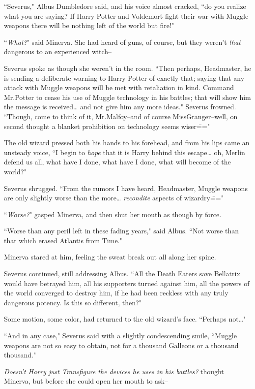 ``Severus," Albus Dumbledore said, and his voice almost cracked, ``do you realize what you are saying? If Harry Potter and Voldemort fight their war with Muggle weapons there will be nothing left of the world but fire!"

``\emph{What?}" said Minerva. She had heard of guns, of course, but they weren't \emph{that} dangerous to an experienced witch\---

Severus spoke as though she weren't in the room. ``Then perhaps, Headmaster, he is sending a deliberate warning to Harry Potter of exactly that; saying that any attack with Muggle weapons will be met with retaliation in kind. Command Mr.\?Potter to cease his use of Muggle technology in his battles; that will show him the message is received{\ldots} and not give him any more ideas." Severus frowned. ``Though, come to think of it, Mr.\?Malfoy\---and of course Miss\?Granger\---well, on second thought a blanket prohibition on technology seems wiser\==="

The old wizard pressed both his hands to his forehead, and from his lips came an unsteady voice, ``I begin to \emph{hope} that it is Harry behind this escape{\ldots} oh, Merlin defend us all, what have I done, what have I done, what will become of the world?"

Severus shrugged. ``From the rumors I have heard, Headmaster, Muggle weapons are only slightly worse than the more{\ldots} \emph{recondite} aspects of wizardry\==="

``\emph{Worse?}" gasped Minerva, and then shut her mouth as though by force.

``Worse than any peril left in these fading years," said Albus. ``Not worse than that which erased Atlantis from Time."

Minerva stared at him, feeling the sweat break out all along her spine.

Severus continued, still addressing Albus. ``All the Death Eaters save Bellatrix would have betrayed him, all his supporters turned against him, all the powers of the world converged to destroy him, if he had been reckless with any truly dangerous potency. Is this so different, then?"

Some motion, some color, had returned to the old wizard's face. ``Perhaps not{\ldots}"

``And in any case," Severus said with a slightly condescending smile, ``Muggle weapons are not so easy to obtain, not for a thousand Galleons or a thousand thousand."

\emph{Doesn't Harry just Transfigure the devices he uses in his battles?} thought Minerva, but before she could open her mouth to ask\---

